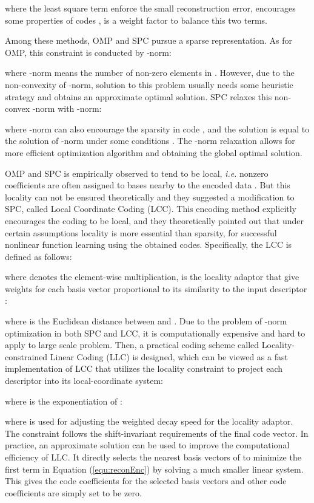 \documentclass[twocolumn]{svjour3}          \smartqed  \usepackage{slashbox}
\begin{document}
where the least square term enforce the small reconstruction error,  encourages some properties of codes ,  is a weight factor to balance this two terms.

Among these methods, OMP and SPC pursue a sparse representation. As for OMP, this constraint is conducted by -norm:

where -norm means the number of non-zero elements in . However, due to the non-convexity of -norm, solution to this problem usually needs some heuristic strategy and obtains an approximate optimal solution. SPC relaxes this non-convex -norm with -norm:

where -norm can also encourage the sparsity in code , and the solution is equal to the solution of -norm under some conditions \cite{BrucksteinDE09}. The
-norm relaxation allows for more efficient optimization algorithm \cite{LeeBRN06} and obtaining the global optimal solution.

OMP and SPC is empirically observed to tend to be local, \emph{i.e.} nonzero coefficients are often assigned to bases nearby to the encoded data \cite{YuZG09}. But this locality can not be ensured theoretically and they suggested a modification to SPC, called Local Coordinate Coding (LCC). This encoding method explicitly encourages the coding to be local, and they theoretically pointed out that under certain assumptions locality is more essential than sparsity, for successful nonlinear function learning using the obtained codes. Specifically, the LCC is defined as follows:

where  denotes the element-wise multiplication,  is the locality adaptor that give weights for each basis vector proportional to its similarity to the input descriptor :

where  is the Euclidean distance between  and . Due to the problem of -norm optimization in both SPC and LCC, it is computationally expensive and hard to apply to large scale problem. Then, a practical coding scheme called Locality-constrained Linear Coding (LLC) \cite{WangYYLHG10} is designed, which can be viewed as a fast implementation of LCC that utilizes the locality constraint to project each descriptor into its local-coordinate system:

where  is the exponentiation of :

where  is used for adjusting the weighted decay speed for the locality adaptor. The constraint  follows the shift-invariant requirements of the final code vector. In practice, an approximate solution can be used to improve the computational efficiency of LLC. It directly selects the  nearest basis vectors of  to minimize the first term in Equation (\ref{equ:reconEnc}) by solving a much smaller linear system. This gives the code coefficients for the selected  basis vectors and other code coefficients are simply set to be zero.
\end{document}
